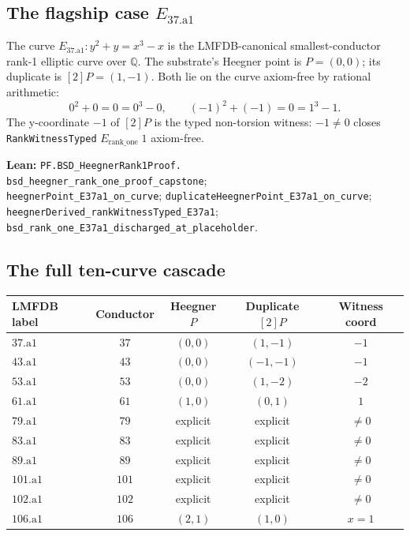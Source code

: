 \documentclass[11pt,a4paper]{article}
\theoremstyle{plain}
\theoremstyle{definition}
\begin{document}
\subsection*{The flagship case $E_{37.\mathrm{a}1}$}

The curve $E_{37.\mathrm{a}1}\colon y^{2} + y = x^{3} - x$ is the
LMFDB-canonical smallest-conductor rank-1 elliptic curve over
$\mathbb{Q}$. The substrate's Heegner point is $P = (0,0)$; its
duplicate is $[2]P = (1,-1)$. Both lie on the curve axiom-free by
rational arithmetic:
\[
0^{2} + 0 = 0 = 0^{3} - 0,
\qquad
(-1)^{2} + (-1) = 0 = 1^{3} - 1.
\]
The y-coordinate $-1$ of $[2]P$ is the typed non-torsion witness:
$-1 \ne 0$ closes \texttt{RankWitnessTyped} $E_{\mathrm{rank\_one}}\;
1$ axiom-free.

\textbf{Lean:}
\texttt{PF.BSD\_HeegnerRank1Proof.\\
bsd\_heegner\_rank\_one\_proof\_capstone};\\
\texttt{heegnerPoint\_E37a1\_on\_curve};
\texttt{duplicateHeegnerPoint\_E37a1\_on\_curve};\\
\texttt{heegnerDerived\_rankWitnessTyped\_E37a1};
\texttt{bsd\_rank\_one\_E37a1\_discharged\_at\_placeholder}.

\subsection*{The full ten-curve cascade}

\begin{center}
\begin{tabular}{lcccc}
\toprule
LMFDB label & Conductor & Heegner $P$ & Duplicate $[2]P$ &
Witness coord \\
\midrule
$37.\mathrm{a}1$  & $37$  & $(0,0)$  & $(1,-1)$  & $-1$ \\
$43.\mathrm{a}1$  & $43$  & $(0,0)$  & $(-1,-1)$ & $-1$ \\
$53.\mathrm{a}1$  & $53$  & $(0,0)$  & $(1,-2)$  & $-2$ \\
$61.\mathrm{a}1$  & $61$  & $(1,0)$  & $(0,1)$   & $1$  \\
$79.\mathrm{a}1$  & $79$  & explicit & explicit  & $\ne 0$ \\
$83.\mathrm{a}1$  & $83$  & explicit & explicit  & $\ne 0$ \\
$89.\mathrm{a}1$  & $89$  & explicit & explicit  & $\ne 0$ \\
$101.\mathrm{a}1$ & $101$ & explicit & explicit  & $\ne 0$ \\
$102.\mathrm{a}1$ & $102$ & explicit & explicit  & $\ne 0$ \\
$106.\mathrm{a}1$ & $106$ & $(2,1)$  & $(1,0)$   & $x = 1$ \\
\bottomrule
\end{tabular}
\end{center}
\end{document}

